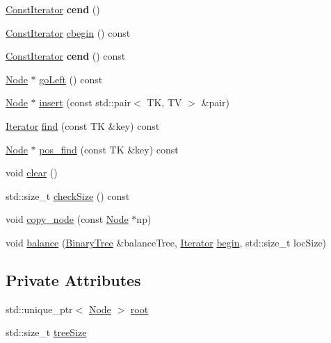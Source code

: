 \begin{DoxyCompactItemize}
\item 
\mbox{\label{classBinaryTree_a503645b7d06f1c24ba25042d3e1987b5}} 
\mbox{\hyperlink{classBinaryTree_1_1ConstIterator}{Const\+Iterator}} {\bfseries cend} ()
\item 
\mbox{\hyperlink{classBinaryTree_1_1ConstIterator}{Const\+Iterator}} \mbox{\hyperlink{classBinaryTree_a70ad506f00c666f7e3b26f78e66709c7}{cbegin}} () const
\item 
\mbox{\label{classBinaryTree_a9557ea5e5b15a398aaa390313a73be44}} 
\mbox{\hyperlink{classBinaryTree_1_1ConstIterator}{Const\+Iterator}} {\bfseries cend} () const
\item 
\mbox{\hyperlink{structBinaryTree_1_1Node}{Node}} $\ast$ \mbox{\hyperlink{classBinaryTree_a5b7168f283acc83b39e5af15b9817b47}{go\+Left}} () const
\item 
\mbox{\hyperlink{structBinaryTree_1_1Node}{Node}} $\ast$ \mbox{\hyperlink{classBinaryTree_a356114cfeed3598a9a37907eafed7b25}{insert}} (const std\+::pair$<$ TK, TV $>$ \&pair)
\item 
\mbox{\hyperlink{classBinaryTree_1_1Iterator}{Iterator}} \mbox{\hyperlink{classBinaryTree_ab7ca7386a799bd4ec8cece3a0e15d7e3}{find}} (const TK \&key) const
\item 
\mbox{\hyperlink{structBinaryTree_1_1Node}{Node}} $\ast$ \mbox{\hyperlink{classBinaryTree_a59ebcb199618fe76be5f3a9c813c95c9}{pos\+\_\+find}} (const TK \&key) const
\item 
void \mbox{\hyperlink{classBinaryTree_a264446922f6d5fe75d4a41c650f88d6a}{clear}} ()
\item 
std\+::size\+\_\+t \mbox{\hyperlink{classBinaryTree_a8e35d6be680d9fbd5129361337ada338}{check\+Size}} () const
\item 
void \mbox{\hyperlink{classBinaryTree_a01dfd4a677465fbc20923794e2363b44}{copy\+\_\+node}} (const \mbox{\hyperlink{structBinaryTree_1_1Node}{Node}} $\ast$np)
\item 
void \mbox{\hyperlink{classBinaryTree_a1c3972b0a02afa3c6c35dcad6b8440c5}{balance}} (\mbox{\hyperlink{classBinaryTree}{Binary\+Tree}} \&balance\+Tree, \mbox{\hyperlink{classBinaryTree_1_1Iterator}{Iterator}} \mbox{\hyperlink{classBinaryTree_a828acf65e70cf4b6e106807a052ca508}{begin}}, std\+::size\+\_\+t loc\+Size)
\end{DoxyCompactItemize}
\subsection*{Private Attributes}
\begin{DoxyCompactItemize}
\item 
std\+::unique\+\_\+ptr$<$ \mbox{\hyperlink{structBinaryTree_1_1Node}{Node}} $>$ \mbox{\hyperlink{classBinaryTree_a787363fcf3a4109694808f03b3793614}{root}}
\item 
std\+::size\+\_\+t \mbox{\hyperlink{classBinaryTree_a95c64190503d0c8f5f7878bfb4aaf841}{tree\+Size}}
\end{DoxyCompactItemize}
